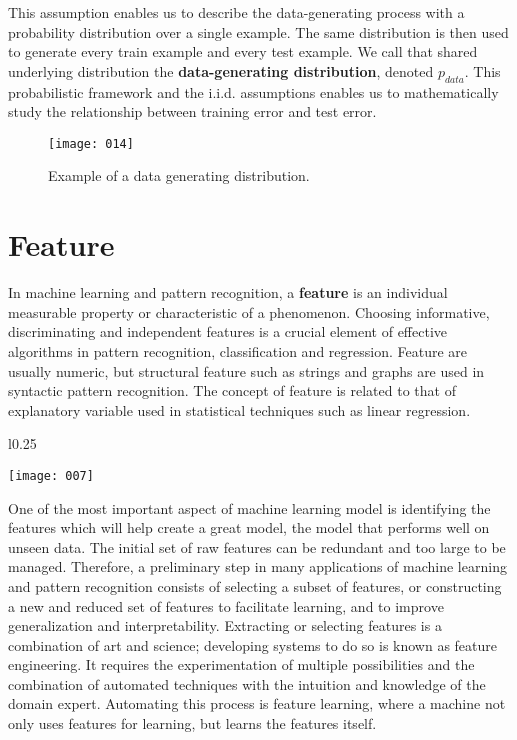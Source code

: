 This assumption enables us to describe the data-generating process with a probability distribution over a single example. The same distribution is then used to generate every train example and every test example. We call that shared underlying distribution the \textbf{data-generating distribution}, denoted \(p_{data}\). This probabilistic framework and the i.i.d. assumptions enables us to mathematically study the relationship between training error and test error.
\begin{figure}[h]
\begin{center}
    \texttt{[image: 014]}
    \caption{}
\end{center}
\caption{Example of a data generating distribution.}
\end{figure}

\section{Feature}

In machine learning and pattern recognition, a \textbf{feature} is an individual measurable property or characteristic of a phenomenon. Choosing informative, discriminating and independent features is a crucial element of effective algorithms in pattern recognition, classification and regression. Feature are usually numeric, but structural feature such as strings and graphs are used in syntactic pattern recognition. The concept of feature is related to that of explanatory variable used in statistical techniques such as linear regression.

\begin{wrapfigure}{l}{0.25\textwidth}
    \begin{center}
      \texttt{[image: 007]}
    \end{center}
\end{wrapfigure}

One of the most important aspect of machine learning model is identifying the features which will help create a great model, the model that performs well on unseen data. The initial set of raw features can be redundant and too large to be managed. Therefore, a preliminary step in many applications of machine learning and pattern recognition consists of selecting a subset of features, or constructing a new and reduced set of features to facilitate learning, and to improve generalization and interpretability. Extracting or selecting features is a combination of art and science; developing systems to do so is known as feature engineering. It requires the experimentation of multiple possibilities and the combination of automated techniques with the intuition and knowledge of the domain expert. Automating this process is feature learning, where a machine not only uses features for learning, but learns the features itself.

